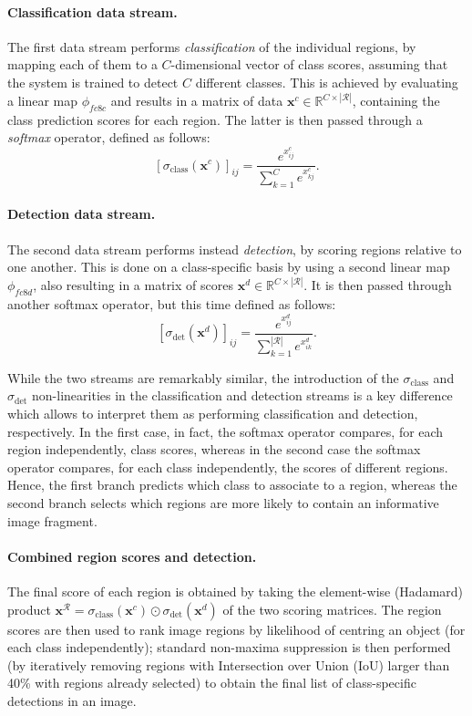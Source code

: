 \documentclass[10pt,twocolumn,letterpaper]{article}
\newcommand{\bx}{\mathbf{x}}
\begin{document}
\paragraph{Classification data stream.} The first data stream performs \emph{classification} of the individual regions, by mapping each of them to a $C$-dimensional vector of class scores, assuming that the system is trained to detect $C$ different classes. This is achieved by evaluating a linear map $\phi_{fc8c}$ and results in a matrix of data $\bx^c \in \mathbb{R}^{C \times |\mathcal{R}|}$, containing the class prediction scores for each region. The latter is then passed through a \emph{softmax} operator, defined as follows:
\begin{equation}\label{e:softmaxc}
  [\sigma_\text{class}(\bx^c)]_{ij}
  = 
  \frac{e^{x^c_{ij}}}{\sum_{k=1}^{C} e^{x^c_{kj}}}.
\end{equation}\paragraph{Detection data stream.} The second data stream performs instead \emph{detection}, by scoring regions relative to one another. This is done on a class-specific basis by using a second linear map $\phi_{fc8d}$, also resulting in a matrix of scores $\bx^d \in \mathbb{R}^{C \times |\mathcal{R}|}$. It is then passed through another softmax operator, but this time defined as follows:
\begin{equation}\label{e:softmaxd}
  [\sigma_\text{det}(\bx^d)]_{ij}
  = 
  \frac{e^{x^d_{ij}}}{\sum_{k=1}^{|\mathcal{R}|} e^{x^d_{ik}}}.
\end{equation}

While the two streams are remarkably similar, the introduction of the $\sigma_\text{class}$ and $\sigma_\text{det}$ non-linearities in the classification and detection streams is a key difference which allows to interpret them as performing classification and detection, respectively. In the first case, in fact, the softmax operator compares, for each region independently, class scores, whereas in the second case the softmax operator compares, for each class independently, the scores of different regions. Hence, the first branch predicts which class to associate to a region, whereas the second branch selects which regions are more likely to contain an informative image fragment.

\paragraph{Combined region scores and detection.} The final score of each region is obtained by taking the element-wise (Hadamard) product $\bx^\mathcal{R} = \sigma_\text{class}(\bx^c) \odot \sigma_\text{det}(\bx^d)$ of the two scoring matrices. The region scores are then used to rank image regions by likelihood of centring an object (for each class independently); standard non-maxima suppression is then performed (by iteratively removing regions with Intersection over Union (IoU) larger than 40\% with regions already selected) to obtain the final list of class-specific detections in an image.
\end{document}
